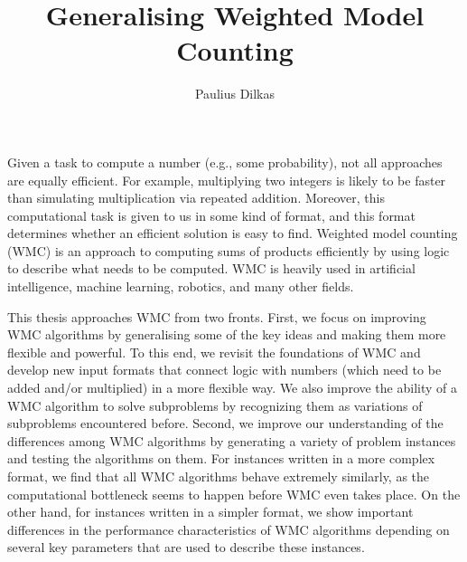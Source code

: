 \documentclass[phd,aiai,twoside,fullspacing,logo]{infthesis}
\title{Generalising Weighted Model Counting}
\author{Paulius Dilkas}
\theoremstyle{definition}
\theoremstyle{remark}
\numberwithin{assumption}{chapter}
\numberwithin{conjecture}{chapter}
\numberwithin{constraint}{chapter}
\numberwithin{fact}{chapter}
\numberwithin{proposition}{chapter}
\numberwithin{theorem}{chapter}
\numberwithin{lemma}{chapter}
\numberwithin{definition}{chapter}
\numberwithin{example}{chapter}
\numberwithin{experiment}{chapter}
\begin{document}
\nobibliography*

\begin{preliminary}

\maketitle

\begin{laysummary}
  Given a task to compute a number (e.g., some probability), not all approaches
  are equally efficient. For example, multiplying two integers is likely to be
  faster than simulating multiplication via repeated addition. Moreover, this
  computational task is given to us in some kind of format, and this format
  determines whether an efficient solution is easy to find. Weighted model
  counting (WMC) is an approach to computing sums of products efficiently by
  using logic to describe what needs to be computed. WMC is heavily used in
  artificial intelligence, machine learning, robotics, and many other fields.

  This thesis approaches WMC from two fronts. First, we focus on improving WMC
  algorithms by generalising some of the key ideas and making them more flexible
  and powerful. To this end, we revisit the foundations of WMC and develop new
  input formats that connect logic with numbers (which need to be added and/or
  multiplied) in a more flexible way. We also improve the ability of a WMC
  algorithm to solve subproblems by recognizing them as variations of
  subproblems encountered before. Second, we improve our understanding of the
  differences among WMC algorithms by generating a variety of problem instances
  and testing the algorithms on them. For instances written in a more complex
  format, we find that all WMC algorithms behave extremely similarly, as the
  computational bottleneck seems to happen before WMC even takes place. On the
  other hand, for instances written in a simpler format, we show important
  differences in the performance characteristics of WMC algorithms depending on
  several key parameters that are used to describe these instances.
\end{laysummary}

\begin{acknowledgements}



\end{acknowledgements}
\end{preliminary}
\end{document}
